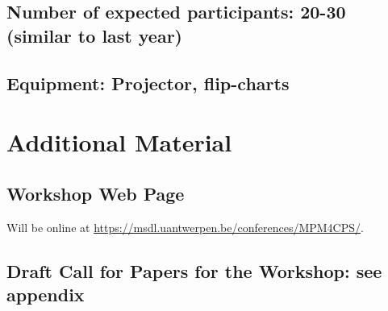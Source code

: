 \subsection{Number of expected participants: 20-30 (similar to last year)}

\subsection{Equipment: Projector, flip-charts}

\section{Additional Material}
\subsection{Workshop Web Page}
Will be online at \url{https://msdl.uantwerpen.be/conferences/MPM4CPS/}.

\subsection{Draft Call for Papers for the Workshop: see appendix}
\newpage


